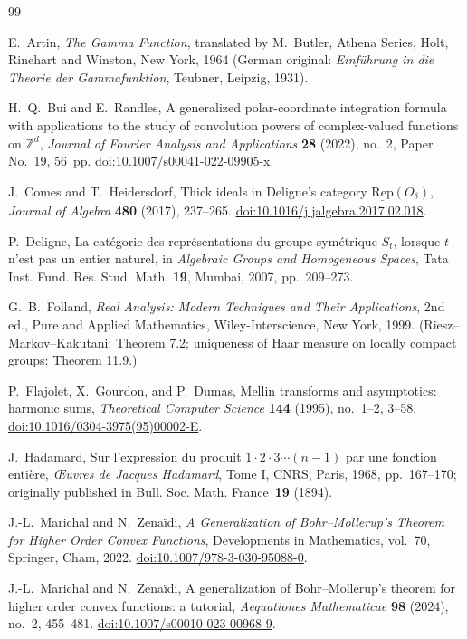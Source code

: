 \documentclass[11pt,a4paper]{article}
\theoremstyle{plain}
\theoremstyle{definition}
\theoremstyle{remark}
\newcommand{\Z}{\mathbb{Z}}
\begin{document}
\begin{thebibliography}{99}

E.~Artin,
\emph{The Gamma Function},
translated by M.~Butler,
Athena Series, Holt, Rinehart and Winston, New York, 1964
(German original: \emph{Einführung in die Theorie der Gammafunktion}, Teubner, Leipzig, 1931).

H.~Q.~Bui and E.~Randles,
A generalized polar-coordinate integration formula with applications to the study of convolution powers of complex-valued functions on $\Z^d$,
\emph{Journal of Fourier Analysis and Applications} \textbf{28} (2022), no.~2, Paper No.~19, 56~pp.
\href{https://doi.org/10.1007/s00041-022-09905-x}{doi:10.1007/s00041-022-09905-x}.

J.~Comes and T.~Heidersdorf,
Thick ideals in Deligne's category $\underline{\mathrm{Rep}}(O_\delta)$,
\emph{Journal of Algebra} \textbf{480} (2017), 237--265.
\href{https://doi.org/10.1016/j.jalgebra.2017.02.018}{doi:10.1016/j.jalgebra.2017.02.018}.

P.~Deligne,
La catégorie des représentations du groupe symétrique $S_t$, lorsque $t$ n'est pas un entier naturel,
in \emph{Algebraic Groups and Homogeneous Spaces}, Tata Inst. Fund. Res. Stud. Math. \textbf{19}, Mumbai, 2007, pp.~209--273.

G.~B.~Folland,
\emph{Real Analysis: Modern Techniques and Their Applications},
2nd ed., Pure and Applied Mathematics, Wiley-Interscience, New York, 1999.
(Riesz--Markov--Kakutani: Theorem 7.2; uniqueness of Haar measure on locally compact groups: Theorem 11.9.)

P.~Flajolet, X.~Gourdon, and P.~Dumas,
Mellin transforms and asymptotics: harmonic sums,
\emph{Theoretical Computer Science} \textbf{144} (1995), no.~1--2, 3--58.
\href{https://doi.org/10.1016/0304-3975(95)00002-E}{doi:10.1016/0304-3975(95)00002-E}.

J.~Hadamard,
Sur l'expression du produit $1\cdot 2\cdot 3\cdots(n-1)$ par une fonction entière,
\emph{Œuvres de Jacques Hadamard}, Tome I, CNRS, Paris, 1968, pp.~167--170;
originally published in Bull. Soc. Math. France~\textbf{19} (1894).

J.-L.~Marichal and N.~Zenaïdi,
\emph{A Generalization of Bohr--Mollerup's Theorem for Higher Order Convex Functions},
Developments in Mathematics, vol.~70, Springer, Cham, 2022.
\href{https://doi.org/10.1007/978-3-030-95088-0}{doi:10.1007/978-3-030-95088-0}.

J.-L.~Marichal and N.~Zenaïdi,
A generalization of Bohr--Mollerup's theorem for higher order convex functions: a tutorial,
\emph{Aequationes Mathematicae} \textbf{98} (2024), no.~2, 455--481.
\href{https://doi.org/10.1007/s00010-023-00968-9}{doi:10.1007/s00010-023-00968-9}.

\end{thebibliography}
\end{document}
